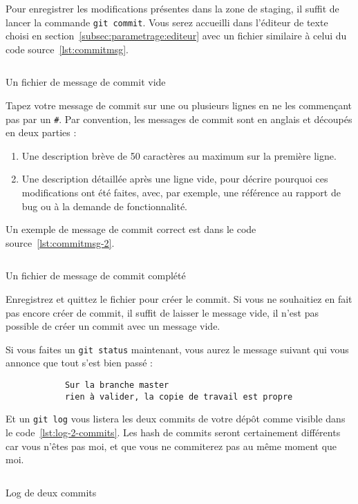 \documentclass[10pt,a4paper,french]{article}
\renewcommand{\listoflistingscaption}{Table des codes sources}
\begin{document}
        Pour enregistrer les modifications présentes dans la zone de staging, il suffit de lancer la commande \verb|git commit|. Vous serez accueilli dans l'éditeur de texte choisi en section~\ref{subsec:parametrage:editeur} avec un fichier similaire à celui du code source~\ref{lst:commitmsg}.

        \begin{listing}[ht]
            \inputminted{sh}{ressources/COMMITMSG-1.txt}
            \caption{Un fichier de message de commit vide}
            \label{lst:commitmsg}
        \end{listing}

        Tapez votre message de commit sur une ou plusieurs lignes en ne les commençant pas par un \verb|#|. Par convention, les messages de commit sont en anglais et découpés en deux parties :
        \begin{enumerate}
            \item Une description brève de 50 caractères au maximum sur la première ligne.
            \item Une description détaillée après une ligne vide, pour décrire pourquoi ces modifications ont été faites, avec, par exemple, une référence au rapport de bug ou à la demande de fonctionnalité.
        \end{enumerate}
        Un exemple de message de commit correct est dans le code source~\ref{lst:commitmsg-2}.

        \begin{listing}[ht]
            \inputminted{sh}{ressources/COMMITMSG-2.txt}
            \caption{Un fichier de message de commit complété}
            \label{lst:commitmsg-2}
        \end{listing}

        Enregistrez et quittez le fichier pour créer le commit.
        Si vous ne souhaitiez en fait pas encore créer de commit, il suffit de laisser le message vide, il n'est pas possible de créer un commit avec un message vide.

        Si vous faites un \verb|git status| maintenant, vous aurez le message suivant qui vous annonce que tout s'est bien passé :
        \begin{verbatim}
            Sur la branche master
            rien à valider, la copie de travail est propre
        \end{verbatim}

        Et un \verb|git log| vous listera les deux commits de votre dépôt comme visible dans le code~\ref{lst:log-2-commits}. Les hash de commits seront certainement différents car vous n'êtes pas moi, et que vous ne commiterez pas au même moment que moi.

        \begin{listing}[ht]
            \inputminted{text}{ressources/log-2-commits.txt}
            \caption{Log de deux commits}
            \label{lst:log-2-commits}
        \end{listing}

\listoflistings
    \addcontentsline{toc}{section}{\listoflistingscaption}
\end{document}
